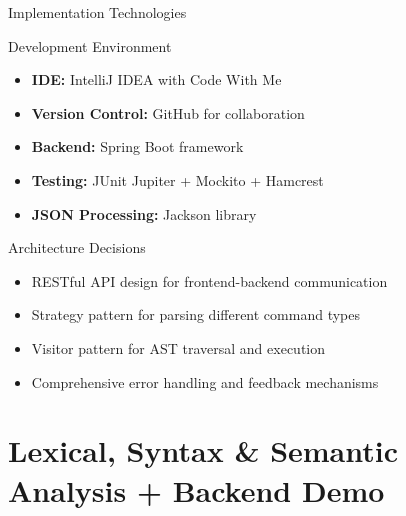\documentclass{beamer}
\begin{document}
\begin{frame}{Implementation Technologies}
\begin{block}{Development Environment}
\begin{itemize}
    \item \textbf{IDE:} IntelliJ IDEA with Code With Me
    \item \textbf{Version Control:} GitHub for collaboration
    \item \textbf{Backend:} Spring Boot framework
    \item \textbf{Testing:} JUnit Jupiter + Mockito + Hamcrest
    \item \textbf{JSON Processing:} Jackson library
\end{itemize}
\end{block}

\begin{block}{Architecture Decisions}
\begin{itemize}
    \item RESTful API design for frontend-backend communication
    \item Strategy pattern for parsing different command types
    \item Visitor pattern for AST traversal and execution
    \item Comprehensive error handling and feedback mechanisms
\end{itemize}
\end{block}
\end{frame}


\section{Lexical, Syntax \& Semantic Analysis + Backend Demo}
\end{document}
